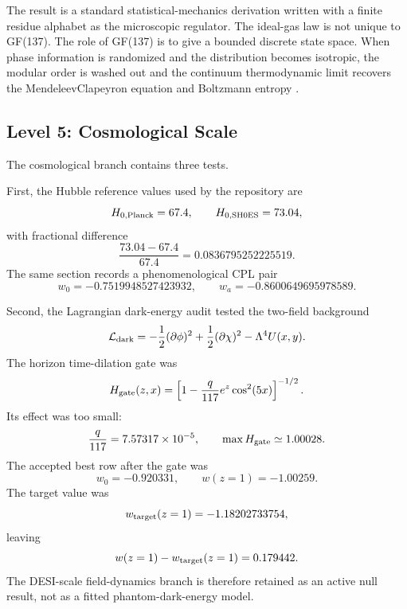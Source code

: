 \documentclass[11pt]{article}
\begin{document}
The result is a standard statistical-mechanics derivation written with a
finite residue alphabet as the microscopic regulator.  The ideal-gas law is
not unique to GF(137).  The role of GF(137) is to give a bounded discrete
state space.  When phase information is randomized and the distribution becomes
isotropic, the modular order is washed out and the continuum thermodynamic
limit recovers the Mendeleev\textendash{}Clapeyron equation and Boltzmann entropy
\cite{boltzmann1896,gibbs1902}.

\subsection{Level 5: Cosmological Scale}

The cosmological branch contains three tests.

First, the Hubble reference values used by the repository are
\begin{equation}
    H_{0,\rm Planck}=67.4,
    \qquad
    H_{0,\rm SH0ES}=73.04,
\end{equation}
with fractional difference
\begin{equation}
    \frac{73.04-67.4}{67.4}=0.0836795252225519.
\end{equation}
The same section records a phenomenological CPL pair
\begin{equation}
    w_0=-0.7519948527423932,
    \qquad
    w_a=-0.8600649695978589.
\end{equation}

Second, the Lagrangian dark-energy audit tested the two-field background
\begin{equation}
    \mathcal{L}_{\rm dark}
    =
    -\frac{1}{2}(\partial\phi)^2
    +\frac{1}{2}(\partial\chi)^2
    -\Lambda^4U(x,y).
\end{equation}
The horizon time-dilation gate was
\begin{equation}
    H_{\rm gate}(z,x)
    =
    \left[
        1-\frac{q}{117}e^z\cos^2(5x)
    \right]^{-1/2}.
\end{equation}
Its effect was too small:
\begin{equation}
    \frac{q}{117}=7.57317\times10^{-5},
    \qquad
    \max H_{\rm gate}\simeq1.00028.
\end{equation}
The accepted best row after the gate was
\begin{equation}
    w_0=-0.920331,\qquad w(z=1)=-1.00259.
\end{equation}
The target value was
\begin{equation}
    w_{\rm target}(z=1)=-1.18202733754,
\end{equation}
leaving
\begin{equation}
    w(z=1)-w_{\rm target}(z=1)=0.179442.
\end{equation}
The DESI-scale field-dynamics branch is therefore retained as an active
null result, not as a fitted phantom-dark-energy model.
\end{document}
